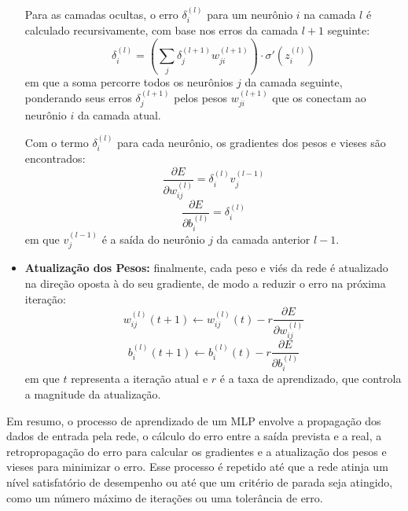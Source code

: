 \begin{itemize}
Para as camadas ocultas, o erro $ \delta_i^{(l)} $ para um neurônio $ i $ na camada $ l $ é calculado recursivamente, 
com base nos erros da camada $ l+1 $ seguinte:
\begin{equation}
\label{eq:erro_oculta_v}
\delta_i^{(l)} = \left( \sum_{j} \delta_j^{(l+1)} w_{ji}^{(l+1)} \right) \cdot \sigma'(z_i^{(l)})
\end{equation}
em que a soma percorre todos os neurônios $j$ da camada seguinte, ponderando seus erros $\delta_j^{(l+1)}$ pelos 
pesos $w_{ji}^{(l+1)}$ que os conectam ao neurônio $i$ da camada atual.

Com o termo $\delta_i^{(l)}$ para cada neurônio, os gradientes dos pesos e vieses são encontrados:
\begin{equation}
\label{eq:gradiente_pesos_v}
\frac{\partial E}{\partial w_{ij}^{(l)}} = \delta_i^{(l)} v_j^{(l-1)}
\end{equation}
\begin{equation}
\label{eq:gradiente_bias_v}
\frac{\partial E}{\partial b_i^{(l)}} = \delta_i^{(l)}
\end{equation}
em que $v_j^{(l-1)}$ é a saída do neurônio $j$ da camada anterior $l-1$.

\item \textbf{Atualização dos Pesos:} finalmente, cada peso e viés da rede é atualizado na direção oposta à do seu gradiente, 
de modo a reduzir o erro na próxima iteração:
\begin{equation}
\label{eq:atualizacao_mlp_v}
w_{ij}^{(l)}(t+1) \leftarrow w_{ij}^{(l)}(t) - r \frac{\partial E}{\partial w_{ij}^{(l)}}
\end{equation}
\begin{equation}
\label{eq:atualizacao_bias_v}
b_i^{(l)}(t+1) \leftarrow b_i^{(l)}(t) - r \frac{\partial E}{\partial b_i^{(l)}}
\end{equation}
em que $t$ representa a iteração atual e $r$ é a taxa de aprendizado, que controla a magnitude da atualização.
\end{itemize}

Em resumo, o processo de aprendizado de um MLP envolve a propagação dos dados de entrada pela rede, o cálculo do erro entre 
a saída prevista e a real, a retropropagação do erro para calcular os gradientes e a atualização dos pesos e vieses para 
minimizar o erro. Esse processo é repetido até que a rede atinja um nível satisfatório de desempenho ou até que um critério
de parada seja atingido, como um número máximo de iterações ou uma tolerância de erro.	


